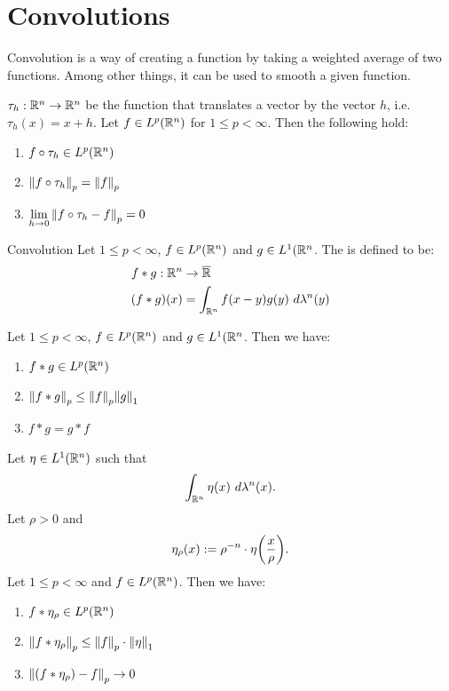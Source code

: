\chapter{Convolutions}
Convolution is a way of creating a function by taking a weighted average of two functions. Among other things, it can be used to smooth a given function.
\begin{lemma}{}{}
	$\tau_h : \mathbb{R}^n \to \mathbb{R}^n$ be the function that translates a vector by the vector $h$, i.e. $\tau_h(x) = x + h$. Let $f \in L^p(\mathbb{R}^n)$ for $1 \leq p < \infty$. Then the following hold: 
	\begin{enumerate}
		\item $f \circ \tau_h \in L^p(\mathbb{R}^n)$
		\item $\norm{f \circ \tau_h}_p = \norm{f}_p$
		\item $\displaystyle \lim_{h \to 0} \norm{f \circ \tau_h - f}_p = 0$
	\end{enumerate}
\end{lemma}
\begin{importantdefinition}{Convolution}{}
	Let $1 \leq p < \infty$, $f \in L^p(\mathbb{R}^n)$ and $g \in L^1(\mathbb{R}^n$. The  is defined to be:
	\begin{align*}
		f * g : 
		\mathbb{R}^n &\to \overline{{\mathbb{R}}}\\
		(f * g)(x) &= \int_{\mathbb{R}^n} f(x-y)g(y) ~d\lambda^n(y)
	\end{align*}
\end{importantdefinition}
\begin{theorem}
	Let $1 \leq p < \infty$, $f \in L^p(\mathbb{R}^n)$ and $g \in L^1(\mathbb{R}^n$. Then we have:
	\begin{enumerate}
		\item $f * g \in L^p(\mathbb{R}^n)$
		\item $\norm{f * g}_p \leq \norm{f}_p \norm{g}_1$
		\item $f * g = g * f$
	\end{enumerate}
\end{theorem}
\pagebreak
\begin{theorem}
	Let $\eta \in L^1(\mathbb{R}^n)$ such that
	\begin{align*}
		\int_{\mathbb{R}^n} \eta(x) ~d\lambda^n(x).
	\end{align*}
	Let $\rho > 0$ and
	\begin{align*}
		\eta_\rho(x) := \rho^{-n} \cdot \eta\qty(\frac{x}{\rho}).
	\end{align*}
	Let $1 \leq p < \infty$ and $f \in L^p(\mathbb{R}^n)$. Then we have:
	\begin{enumerate}
		\item $f * \eta_\rho \in L^p(\mathbb{R}^n)$
		\item $\norm{f * \eta_\rho}_p \leq \norm{f}_p \cdot \norm{\eta}_1$
		\item 
		$\norm{(f * \eta_\rho) - f}_p \to 0$
	\end{enumerate}
\end{theorem}
